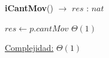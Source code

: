 \documentclass{book}
\begin{document}
\begin{Algoritmos}
    \begin{algorithm}[H]{\textbf{iCantMov}() $\to$ $res$ : $nat$}
        \begin{algorithmic}[1]
                \State $res \gets p.cantMov$                                                                \Comment $\Theta(1)$

                \medskip
                \Statex \underline{Complejidad:} $\Theta(1)$
            \end{algorithmic}
    \end{algorithm}

\end{Algoritmos}
\end{document}
